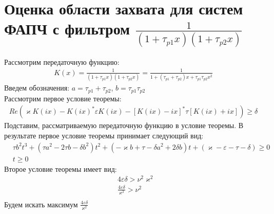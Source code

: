 \documentclass[a4paper]{article}
\begin{document}
\section{Оценка области захвата для систем ФАПЧ с фильтром $\frac{1}{(1+\tau_{p1}x)(1+\tau_{p2}x)}$}
 Рассмотрим передаточную функцию:
 \begin{equation}\label{filter1}
 \begin{aligned}
K(x) = \frac{1}{(1+\tau_{p1}x)(1+\tau_{p2}x)} = \frac{1}{1+(\tau_{p1}+\tau_{p2})x + \tau_{p1}\tau_{p2}x^2}
 \end{aligned}
\end{equation}
Введем обозначения: $a = \tau_{p1}+\tau_{p2}$, $b = \tau_{p1}\tau_{p2}$\\
Рассмотрим первое условие теоремы:
\begin{equation}
 \begin{aligned}
Re(\varkappa K(ix)-K(ix)^*\varepsilon K(ix)-[K(ix)-ix]^*\tau[K(ix)+ix])\geq\delta
 \end{aligned}
\end{equation}
Подставим, рассматриваемую передаточную функцию в условие теоремы. В результате первое условие теоремы принимает следующий вид:
\begin{equation}\label{first_condition}
 \begin{aligned}
&\tau b^2t^3 + (\tau a^2-2 \tau b - \delta b^2)t^2 + (-\varkappa b+\tau-\delta a^2 + 2\delta b)t + (\varkappa-\varepsilon-\tau-\delta) \geq 0\\
&t \geq 0
 \end{aligned}
\end{equation}
Второе условие теоремы имеет вид: 
\begin{equation}\label{first_condition}
 \begin{aligned}
&4\varepsilon\delta > \nu^2\varkappa^2\\
&\frac{4\varepsilon\delta}{\varkappa^2} > \nu^2\\
 \end{aligned}
\end{equation}
Будем искать максимум $\frac{4\varepsilon\delta}{\varkappa^2}$
\end{document}
